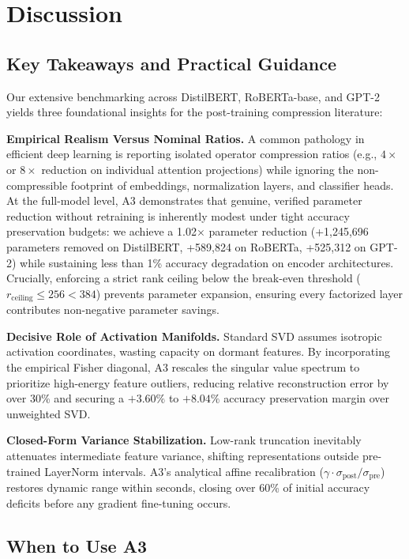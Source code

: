 \section{Discussion}
\label{sec:discussion}

\subsection{Key Takeaways and Practical Guidance}
\label{sec:practical_guidance}

Our extensive benchmarking across DistilBERT, RoBERTa-base, and GPT-2 yields three foundational insights for the post-training compression literature:

\textbf{Empirical Realism Versus Nominal Ratios.} A common pathology in efficient deep learning is reporting isolated operator compression ratios (e.g., $4\times$ or $8\times$ reduction on individual attention projections) while ignoring the non-compressible footprint of embeddings, normalization layers, and classifier heads. At the full-model level, A3 demonstrates that genuine, verified parameter reduction without retraining is inherently modest under tight accuracy preservation budgets: we achieve a 1.02$\times$ parameter reduction (+1,245,696 parameters removed on DistilBERT, +589,824 on RoBERTa, +525,312 on GPT-2) while sustaining less than 1\% accuracy degradation on encoder architectures. Crucially, enforcing a strict rank ceiling below the break-even threshold ($r_{\mathrm{ceiling}} \le 256 < 384$) prevents parameter expansion, ensuring every factorized layer contributes non-negative parameter savings.

\textbf{Decisive Role of Activation Manifolds.} Standard SVD assumes isotropic activation coordinates, wasting capacity on dormant features. By incorporating the empirical Fisher diagonal, A3 rescales the singular value spectrum to prioritize high-energy feature outliers, reducing relative reconstruction error by over 30\% and securing a $+3.60\%$ to $+8.04\%$ accuracy preservation margin over unweighted SVD.

\textbf{Closed-Form Variance Stabilization.} Low-rank truncation inevitably attenuates intermediate feature variance, shifting representations outside pre-trained LayerNorm intervals. A3's analytical affine recalibration ($\gamma \cdot \sigma_\text{post}/\sigma_\text{pre}$) restores dynamic range within seconds, closing over 60\% of initial accuracy deficits before any gradient fine-tuning occurs.

\subsection{When to Use A3}
\label{sec:when_to_use}

